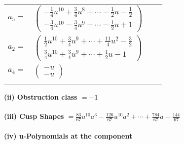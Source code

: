 \documentclass[1p]{elsarticle_modified}
\theoremstyle{definition}
\begin{document}
\begin{tabular}{m{7pt} m{180pt} m{7pt} m{180pt} }
\flushright $a_{5}=$&$\begin{pmatrix}-\frac{1}{4} u^{10}+\frac{3}{4} u^8+\cdots-\frac{1}{2} u-\frac{1}{2}\\-\frac{3}{4} u^{10}-\frac{3}{4} u^9+\cdots-\frac{1}{2} u+1\end{pmatrix}$ \\
\flushright $a_{2}=$&$\begin{pmatrix}\frac{1}{2} u^{10}+\frac{3}{4} u^9+\cdots+\frac{11}{4} u^2-\frac{3}{2}\\\frac{3}{4} u^{10}+\frac{3}{4} u^9+\cdots+\frac{1}{2} u-1\end{pmatrix}$ \\
\flushright $a_{4}=$&$\begin{pmatrix}- u\\- u\end{pmatrix}$\\&\end{tabular}
\flushleft \textbf{(ii) Obstruction class $= -1$}\\~\\
\flushleft \textbf{(iii) Cusp Shapes $= \frac{83}{67} u^{10} a^3-\frac{126}{67} u^{10} a^2+\cdots+\frac{784}{67} a-\frac{144}{67}$}\\~\\
\newpage\renewcommand{\arraystretch}{1}
\flushleft \textbf{(iv) u-Polynomials at the component}\newline \\
\end{document}
